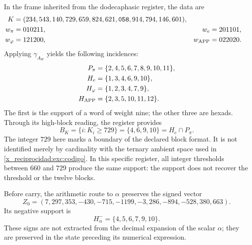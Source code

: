 In the frame inherited from the dodecaphasic register, the data are
\begin{align}
 K={}&(234,543,140,729,659,824,621,\mathtt{058},914,794,146,601),
 \label{x_reciprocidad:exc:k}\\
 w_\pi={}&010211, &w_e={}&201101,\nonumber\\
 w_\varphi={}&121200, &w_{\rm APP}={}&022020.\nonumber
\end{align}
Applying $\gamma_{A_W}$ yields the following incidences:
\begin{align*}
 P_\pi&=\{2,4,5,6,7,8,9,10,11\},\\
 H_e&=\{1,3,4,6,9,10\},\\
 H_\varphi&=\{1,2,3,4,7,9\},\\
 H_{\rm APP}&=\{2,3,5,10,11,12\}.
\end{align*}
The first is the support of a word of weight nine; the other three
are hexads. Through its high-block reading, the register provides
\begin{equation}
 B_K=\{i:K_i\geq729\}=\{4,6,9,10\}=H_e\cap P_\pi.
 \label{x_reciprocidad:exc:bk}
\end{equation}
The integer $729$ here marks a boundary of the declared block
format. It is not identified merely by cardinality with the ternary
ambient space used in \eqref{x_reciprocidad:exc:codigo}. In this specific register, all
integer thresholds between $660$ and $729$ produce the same support:
the support does not recover the threshold or the twelve blocks.

Before carry, the arithmetic route to $\alpha$ preserves the
signed vector
\begin{equation}
 Z_0=(7,297,353,-430,-715,-1199,-3,286,-894,-528,380,663).
 \label{x_reciprocidad:exc:precarry}
\end{equation}
Its negative support is
\begin{equation}
 H^-_\alpha=\{4,5,6,7,9,10\}.
 \label{x_reciprocidad:exc:halpha}
\end{equation}
These signs are not extracted from the decimal expansion of the scalar
$\alpha$; they are preserved in the state preceding its numerical expression.


